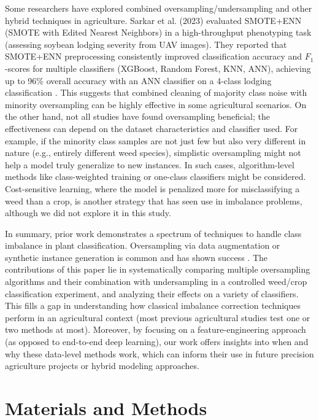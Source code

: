 \documentclass[agriengineering,article,submit,pdftex,moreauthors]{Definitions/mdpi}
\begin{document}
Some researchers have explored combined oversampling/undersampling and other hybrid techniques in agriculture. Sarkar et al. (2023) evaluated SMOTE+ENN (SMOTE with Edited Nearest Neighbors) in a high-throughput phenotyping task (assessing soybean lodging severity from UAV images). They reported that SMOTE+ENN preprocessing consistently improved classification accuracy and $F_{1}$-scores for multiple classifiers (XGBoost, Random Forest, KNN, ANN), achieving up to 96\% overall accuracy with an ANN classifier on a 4-class lodging classification \cite{Sarkar2023-gy}. This suggests that combined cleaning of majority class noise with minority oversampling can be highly effective in some agricultural scenarios. On the other hand, not all studies have found oversampling beneficial; the effectiveness can depend on the dataset characteristics and classifier used. For example, if the minority class samples are not just few but also very different in nature (e.g., entirely different weed species), simplistic oversampling might not help a model truly generalize to new instances. In such cases, algorithm-level methods like class-weighted training or one-class classifiers might be considered. Cost-sensitive learning, where the model is penalized more for misclassifying a weed than a crop, is another strategy that has seen use in imbalance problems, although we did not explore it in this study. 

%
 In summary, prior work demonstrates a spectrum of techniques to handle class imbalance in plant classification. Oversampling via data augmentation or synthetic instance generation is common and has shown success \cite{Sarkar2023-gy} \cite{Miftahushudur2025-dc}. The contributions of this paper lie in systematically comparing multiple oversampling algorithms and their combination with undersampling in a controlled weed/crop classification experiment, and analyzing their effects on a variety of classifiers. This fills a gap in understanding how classical imbalance correction techniques perform in an agricultural context (most previous agricultural studies test one or two methods at most). Moreover, by focusing on a feature-engineering approach (as opposed to end-to-end deep learning), our work offers insights into when and why these data-level methods work, which can inform their use in future precision agriculture projects or hybrid modeling approaches.
%

%
%
%
%
%
%
%
\section{Materials and Methods}
\label{section:materials}
\end{document}
